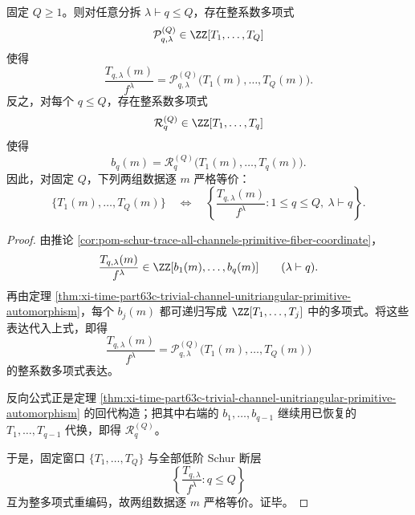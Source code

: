 \begin{corollary}\label{cor:xi-time-part63c-finite-trivial-window-complete-schur-statistic}
固定 \(Q\ge 1\)。则对任意分拆 \(\lambda\vdash q\le Q\)，存在整系数多项式
\[
\mathcal P_{q,\lambda}^{(Q)}\in \ZZ[T_1,\dots,T_Q]
\]
使得
\[
\boxed{\;
\frac{T_{q,\lambda}(m)}{f^\lambda}
=
\mathcal P_{q,\lambda}^{(Q)}\bigl(T_1(m),\dots,T_Q(m)\bigr).\;}
\]
反之，对每个 \(q\le Q\)，存在整系数多项式
\[
\mathcal R_q^{(Q)}\in \ZZ[T_1,\dots,T_q]
\]
使得
\[
\boxed{\;
b_q(m)=\mathcal R_q^{(Q)}\bigl(T_1(m),\dots,T_q(m)\bigr).\;}
\]
因此，对固定 \(Q\)，下列两组数据逐 \(m\) 严格等价：
\[
\{T_1(m),\dots,T_Q(m)\}
\quad\Longleftrightarrow\quad
\left\{\frac{T_{q,\lambda}(m)}{f^\lambda}:1\le q\le Q,\ \lambda\vdash q\right\}.
\]
\end{corollary}
\begin{proof}
由推论 \ref{cor:pom-schur-trace-all-channels-primitive-fiber-coordinate}，
\[
\frac{T_{q,\lambda}(m)}{f^\lambda}\in \ZZ[b_1(m),\dots,b_q(m)]
\qquad(\lambda\vdash q).
\]
再由定理 \ref{thm:xi-time-part63c-trivial-channel-unitriangular-primitive-automorphism}，每个 \(b_j(m)\) 都可递归写成 \(\ZZ[T_1,\dots,T_j]\) 中的多项式。将这些表达代入上式，即得
\[
\frac{T_{q,\lambda}(m)}{f^\lambda}
=
\mathcal P_{q,\lambda}^{(Q)}\bigl(T_1(m),\dots,T_Q(m)\bigr)
\]
的整系数多项式表达。

反向公式正是定理 \ref{thm:xi-time-part63c-trivial-channel-unitriangular-primitive-automorphism} 的回代构造；把其中右端的 \(b_1,\dots,b_{q-1}\) 继续用已恢复的 \(T_1,\dots,T_{q-1}\) 代换，即得 \(\mathcal R_q^{(Q)}\)。

于是，固定窗口 \(\{T_1,\dots,T_Q\}\) 与全部低阶 Schur 断层
\[
\left\{\frac{T_{q,\lambda}}{f^\lambda}:q\le Q\right\}
\]
互为整多项式重编码，故两组数据逐 \(m\) 严格等价。证毕。
\end{proof}

